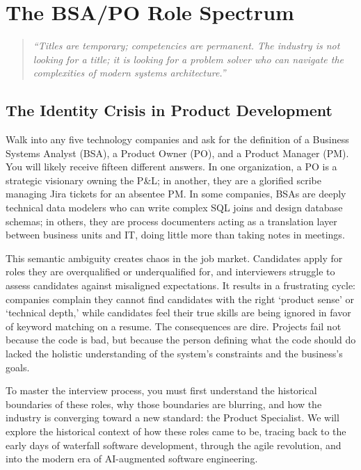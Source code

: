 \chapter{The BSA/PO Role Spectrum}\label{the-bsapo-role-spectrum}

\begin{quote}
\emph{``Titles are temporary; competencies are permanent. The industry
is not looking for a title; it is looking for a problem solver who can
navigate the complexities of modern systems architecture.''}
\end{quote}

\section{The Identity Crisis in Product
Development}\label{the-identity-crisis-in-product-development}

Walk into any five technology companies and ask for the definition of a
Business Systems Analyst (BSA), a Product Owner (PO), and a Product
Manager (PM). You will likely receive fifteen different answers. In one
organization, a PO is a strategic visionary owning the P\&L; in another,
they are a glorified scribe managing Jira tickets for an absentee PM. In
some companies, BSAs are deeply technical data modelers who can write
complex SQL joins and design database schemas; in others, they are
process documenters acting as a translation layer between business units
and IT, doing little more than taking notes in meetings.

This semantic ambiguity creates chaos in the job market. Candidates
apply for roles they are overqualified or underqualified for, and
interviewers struggle to assess candidates against misaligned
expectations. It results in a frustrating cycle: companies complain they
cannot find candidates with the right `product sense' or `technical
depth,' while candidates feel their true skills are being ignored in
favor of keyword matching on a resume. The consequences are dire.
Projects fail not because the code is bad, but because the person
defining what the code should do lacked the holistic understanding of
the system's constraints and the business's goals.

To master the interview process, you must first understand the
historical boundaries of these roles, why those boundaries are blurring,
and how the industry is converging toward a new standard: the Product
Specialist. We will explore the historical context of how these roles
came to be, tracing back to the early days of waterfall software
development, through the agile revolution, and into the modern era of
AI-augmented software engineering.

